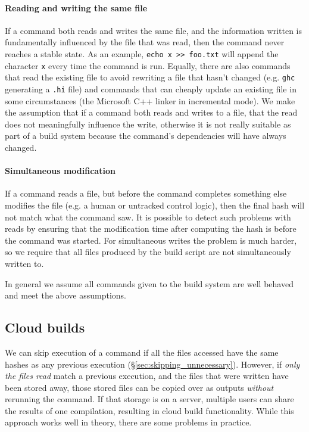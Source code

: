 \paragraph{Reading and writing the same file} If a command both reads and writes the same file, and the information written is fundamentally influenced by the file that was read, then the command never reaches a stable state. As an example, \verb"echo x >> foo.txt" will append the character \texttt{x} every time the command is run. Equally, there are also commands that read the existing file to avoid rewriting a file that hasn't changed (e.g. \texttt{ghc} generating a \texttt{.hi} file) and commands that can cheaply update an existing file in some circumstances (the Microsoft C++ linker in incremental mode). We make the assumption that if a command both reads and writes to a file, that the read does not meaningfully influence the write, otherwise it is not really suitable as part of a build system because the command's dependencies will have always changed.


\paragraph{Simultaneous modification} If a command reads a file, but before the command completes something else modifies the file (e.g. a human or untracked control logic), then the final hash will not match what the command saw. It is possible to detect such problems with reads by ensuring that the modification time after computing the hash is before the command was started. For simultaneous writes the problem is much harder, so we require that all files produced by the build script are not simultaneously written to.

\postparagraphs In general we assume all commands given to the build system are well behaved and meet the above assumptions.

\subsection{Cloud builds}
\label{sec:cloud_builds}

We can skip execution of a command if all the files accessed have the same hashes as any previous execution (\S\ref{sec:skipping_unnecessary}). However, if \emph{only the files read} match a previous execution, and the files that were written have been stored away, those stored files can be copied over as outputs \emph{without} rerunning the command. If that storage is on a server, multiple users can share the results of one compilation, resulting in cloud build functionality. While this approach works well in theory, there are some problems in practice.

